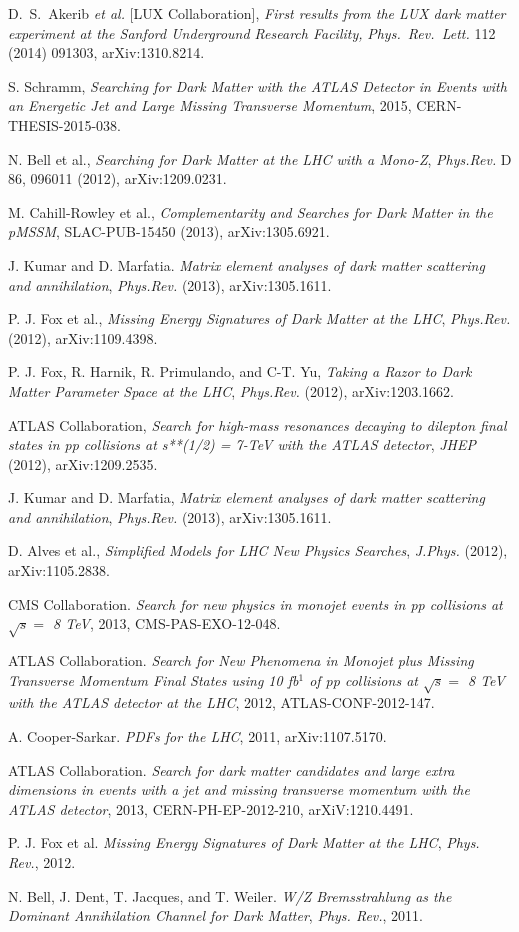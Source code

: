  D.~S.~Akerib {\it et al.} [LUX Collaboration], \emph{First results from the LUX dark matter experiment at the Sanford Underground Research Facility,}
  \emph{Phys.\ Rev.\ Lett.} 112 (2014) 091303, arXiv:1310.8214.

 S. Schramm, \emph{Searching for Dark Matter with the ATLAS Detector in Events with an Energetic Jet and Large Missing Transverse Momentum}, 2015, CERN-THESIS-2015-038.

 N. Bell et al., \emph{Searching for Dark Matter at the LHC with a Mono-Z}, \emph{Phys.Rev.} D 86, 096011 (2012), arXiv:1209.0231.

 M. Cahill-Rowley et al., \emph{Complementarity and Searches for Dark Matter in the pMSSM}, SLAC-PUB-15450 (2013), arXiv:1305.6921.

 J. Kumar and D. Marfatia. \emph{Matrix element analyses of dark matter scattering and annihilation}, \emph{Phys.Rev.} (2013), arXiv:1305.1611.

 P. J. Fox et al., \emph{Missing Energy Signatures of Dark Matter at the LHC}, \emph{Phys.Rev.} (2012), arXiv:1109.4398.

 P. J. Fox, R. Harnik, R. Primulando, and C-T. Yu, \emph{Taking a Razor to Dark Matter Parameter Space at the LHC}, \emph{Phys.Rev.} (2012), arXiv:1203.1662.

 ATLAS Collaboration, \emph{Search for high-mass resonances decaying to dilepton final states in pp collisions at s**(1/2) = 7-TeV with the ATLAS detector}, \emph{JHEP} (2012), arXiv:1209.2535.

 J. Kumar and D. Marfatia, \emph{Matrix element analyses of dark matter scattering and annihilation}, \emph{Phys.Rev.} (2013), arXiv:1305.1611.

 D. Alves et al., \emph{Simplified Models for LHC New Physics Searches}, \emph{J.Phys.} (2012), arXiv:1105.2838.

 CMS Collaboration. \emph{Search for new physics in monojet events in pp collisions at $\sqrt{s} =$ 8 TeV}, 2013, CMS-PAS-EXO-12-048.

 ATLAS Collaboration. \emph{Search for New Phenomena in Monojet plus Missing Transverse Momentum Final States using 10 fb$^{1}$ of pp collisions at $\sqrt{s} =$ 8 TeV with the ATLAS detector at the LHC}, 2012, ATLAS-CONF-2012-147.

 A. Cooper-Sarkar. \emph{PDFs for the LHC}, 2011, arXiv:1107.5170.

 ATLAS Collaboration. \emph{Search for dark matter candidates and large extra dimensions in events with a jet and missing transverse momentum with the ATLAS detector}, 2013, CERN-PH-EP-2012-210, arXiV:1210.4491.

 P. J. Fox et al. \emph{Missing Energy Signatures of Dark Matter at the LHC}, \emph{Phys. Rev.}, 2012.

 N. Bell, J. Dent, T. Jacques, and T. Weiler. \emph{W/Z Bremsstrahlung as the Dominant Annihilation Channel for Dark Matter}, \emph{Phys. Rev.}, 2011.
